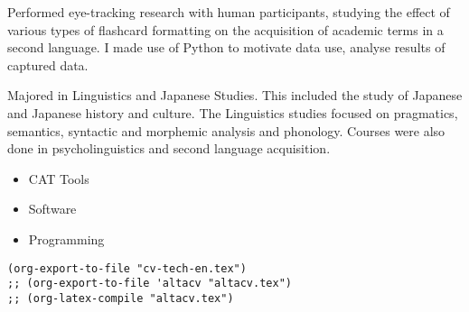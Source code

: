 \documentclass[10pt,a4paper,ragged2e,withhyper]{altacv}
\begin{document}
\begin{paracol}{2}
\label{sec:orgcd31f23}




{}
\label{sec:orgda115c9}
Performed eye-tracking research with human participants, studying the effect of
various types of flashcard formatting on the acquisition of academic terms in a
second language. I made use of Python to motivate data use, analyse results of captured data.
\par\divider
{}
Majored in Linguistics and Japanese Studies. This included the study of Japanese and Japanese history and culture. The Linguistics studies focused on pragmatics, semantics, syntactic and morphemic analysis and phonology. Courses were also done in psycholinguistics and second language acquisition.

\label{sec:org162143c}
\begin{itemize}
\item CAT Tools
\end{itemize}
\begin{itemize}
\item Software
\end{itemize}
\begin{itemize}
\item Programming
\end{itemize}
\cvtag{\LaTeX}

\end{paracol}

\label{sec:org2a29949}
\begin{verbatim}
(org-export-to-file "cv-tech-en.tex")
;; (org-export-to-file 'altacv "altacv.tex")
;; (org-latex-compile "altacv.tex")
\end{verbatim}
\end{document}
